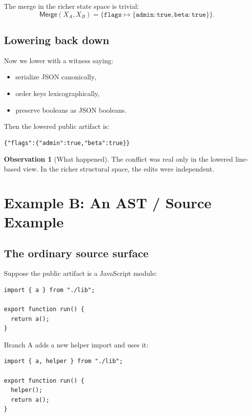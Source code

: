 \documentclass[11pt]{article}
\newcommand{\Merge}{\ensuremath{\mathsf{Merge}}}
\theoremstyle{definition}
\newtheorem{observation}{Observation}
\begin{document}
The merge in the richer state space is trivial:
\[
\Merge(X_A,X_B)=
\{\texttt{flags} \mapsto \{\texttt{admin}:\texttt{true},\texttt{beta}:\texttt{true}\}\}.
\]

\subsection{Lowering back down}

Now we lower with a witness saying:
\begin{itemize}[leftmargin=2em]
\item serialize JSON canonically,
\item order keys lexicographically,
\item preserve booleans as JSON booleans.
\end{itemize}

Then the lowered public artifact is:

\begin{verbatim}
{"flags":{"admin":true,"beta":true}}
\end{verbatim}

\begin{observation}[What happened]
The conflict was real only in the lowered line-based view. In the richer
structural space, the edits were independent.
\end{observation}

\section{Example B: An AST / Source Example}

\subsection{The ordinary source surface}

Suppose the public artifact is a JavaScript module:

\begin{verbatim}
import { a } from "./lib";

export function run() {
  return a();
}
\end{verbatim}

Branch A adds a new helper import and uses it:

\begin{verbatim}
import { a, helper } from "./lib";

export function run() {
  helper();
  return a();
}
\end{verbatim}
\end{document}
